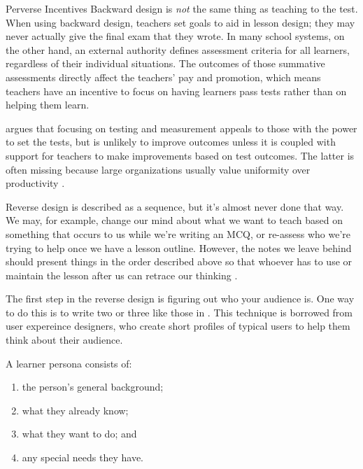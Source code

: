 \begin{aside}{Perverse Incentives}
  Backward design is \emph{not} the same thing as teaching to the test.
  When using backward design,
  teachers set goals to aid in lesson design;
  they may never actually give the final exam that they wrote.
  In many school systems,
  on the other hand,
  an external authority defines assessment criteria for all learners,
  regardless of their individual situations.
  The outcomes of those summative assessments directly affect the teachers' pay and promotion,
  which means teachers have an incentive to focus on having learners pass tests
  rather than on helping them learn.

  \cite{Gree2014} argues that focusing on testing and measurement
  appeals to those with the power to set the tests,
  but is unlikely to improve outcomes
  unless it is coupled with support for teachers to make improvements based on test outcomes.
  The latter is often missing because
  large organizations usually value uniformity over productivity \cite{Scot1998}.
\end{aside}

Reverse design is described as a sequence,
but it's almost never done that way.
We may,
for example, change our mind about what we want to teach
based on something that occurs to us while we're writing an MCQ,
or re-assess who we're trying to help once we have a lesson outline.
However,
the notes we leave behind should present things in the order described above
so that whoever has to use or maintain the lesson after us can retrace our thinking
\cite{Parn1986}.


The first step in the reverse design is figuring out who your audience is.
One way to do this is to write two or three 
like those in .
This technique is borrowed from user expereince designers,
who create short profiles of typical users
to help them think about their audience.

A learner persona consists of:

\begin{enumerate}

\item
  the person's general background;

\item
  what they already know;

\item
  what they want to do;
  and

\item
  any special needs they have.

\end{enumerate}

